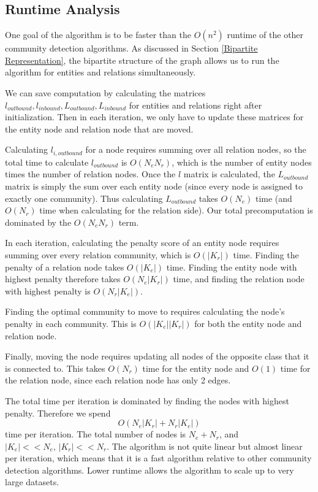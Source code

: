 \documentclass[12pt]{article}
\begin{document}
\subsection{Runtime Analysis}
\label{Runtime Analysis}

One goal of the algorithm is to be faster than the $O(n^2)$ runtime of the
other community detection algorithms\cite{ohai}\cite{other}. As discussed in
Section \ref{Bipartite Representation}, the bipartite structure of the graph
allows us to run the algorithm for entities and relations simultaneously.

We can save computation by calculating the matrices $l_{outbound}, l_{inbound},
L_{outbound}, L_{inbound}$ for entities and relations right after
initialization. Then in each iteration, we only have to update these matrices
for the entity node and relation node that are moved.

Calculating $l_{i, outbound}$ for a node requires summing over all relation
nodes, so the total time to calculate $l_{outbound}$ is $O(N_eN_r)$, which is
the number of entity nodes times the number of relation nodes. Once the $l$
matrix is calculated, the $L_{outbound}$ matrix is simply the sum over each
entity node (since every node is assigned to exactly one community). Thus
calculating $L_{outbound}$ takes $O(N_e)$ time (and $O(N_r)$ time when
calculating for the relation side). Our total precomputation is dominated by the
$O(N_eN_r)$ term.

In each iteration, calculating the penalty score of an entity node requires summing
over every relation community, which is $O(|K_r|)$ time. Finding the penalty of
a relation node takes $O(|K_e|)$ time. Finding the entity node with highest
penalty therefore takes $O(N_e|K_r|)$ time, and finding the relation node with
highest penalty is $O(N_r|K_e|)$.

Finding the optimal community to move to requires calculating the node's penalty
in each community. This is $O(|K_e||K_r|)$ for both the entity node and relation
node.

Finally, moving the node requires updating all nodes of the opposite class that
it is connected to. This takes $O(N_r)$ time for the entity node and $O(1)$ time
for the relation node, since each relation node has only 2 edges.

The total time per iteration is dominated by finding the nodes with highest
penalty. Therefore we spend $$O(N_e|K_r| + N_r|K_e|)$$ time per iteration.
The total number of nodes is $N_e + N_r$, and $|K_e| << N_e,\,|K_r| << N_r$.
The algorithm is not quite linear but almost linear per iteration, which means
that it is a fast algorithm relative to other community detection algorithms.
Lower runtime allows the algorithm to scale up to very large datasets.
\end{document}
